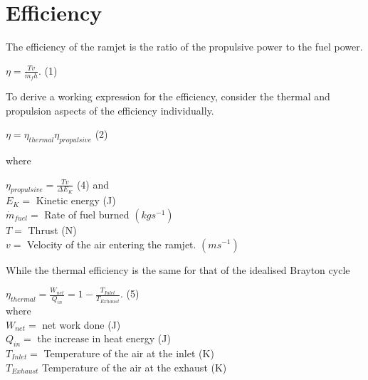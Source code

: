 \documentclass[12pt,onecolumn]{IEEEtran}
\begin{document}
\section{Efficiency}
The efficiency of the ramjet is the ratio of the propulsive power to the fuel power.\cite{greitzer_spakovsky_waitz}\\
\begin{center}
$ \eta = \frac{Tv}{\dot{m}_f h}.$ (1)
\end{center}
To derive a working expression for the efficiency, consider the thermal and propulsion aspects of the efficiency individually.\\
\begin{center}
$ \eta = \eta_{thermal} \eta_{propulsive}$ (2)
\end{center}
where\\
\begin{center}
$\eta_{propulsive}=\frac{Tv}{\Delta E_K} $ (4)
\vspace{1mm}
and\\
\vspace{2mm}
$
E_K = $ Kinetic energy (J)\\
\vspace{1mm}
$\dot{m}_{fuel} = $ Rate of fuel burned $(kgs^{-1})$\\
\vspace{1mm}
\vspace{1mm}
$T = $ Thrust (N)\\
\vspace{1mm}
$v = $ Velocity of the air entering the ramjet. $(ms^{-1})$\\
\end{center}
While the thermal efficiency is the same for that of the idealised Brayton cycle\\
\vspace{1mm}
\begin{center}
$\eta_{thermal}=\frac{W_{net}}{Q_{in}}=1-\frac{T_{Inlet}}{T_{Exhaust}}$. (5)\\
\vspace{2mm}
where\\
$W_{net} = $ net work done (J)\\
\vspace{1mm}
$Q_{in} = $ the increase in heat energy (J)\\
\vspace{1mm}
$T_{Inlet} = $ Temperature of the air at the inlet (K)\\
\vspace{1mm}
$T_{Exhaust} $ Temperature of the air at the exhaust (K)\\
\end{center}
\end{document}
